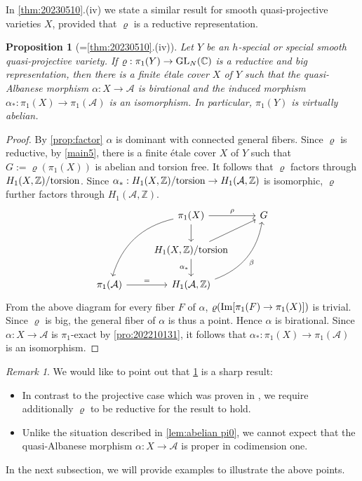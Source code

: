 \documentclass[11pt,english]{smfart}
\theoremstyle{plain}
\newtheorem{proposition}[thm]{Proposition}
\theoremstyle{definition}
\theoremstyle{remark}
\newtheorem{rem}[thm]{Remark}
\numberwithin{equation}{subsection}
\theoremstyle{plain}
\newcommand{\cA}{\mathcal A}
\newcommand{\bC}{\mathbb{C}}
\newcommand{\bZ}{\mathbb{Z}}
\begin{document}
In \cref{thm:20230510}.(iv) we state a similar result  for smooth quasi-projective varieties $X$, provided that $\varrho$ is a reductive representation.   
\begin{proposition}[=\cref{thm:20230510}.(iv)]\label{thm:char}
	Let $Y$ be an $h$-special or   special smooth quasi-projective variety.    If $\varrho:\pi_1(Y)\to {\rm GL}_N(\bC)$ is  a  reductive and  big representation, then there is a finite \'etale cover $X$ of $Y$ such that   the quasi-Albanese morphism $\alpha:X\to \cA$ is  birational  and the induced morphism $\alpha_*:\pi_1(X)\to\pi_1(\cA)$ is an isomorphism.
In particular, $\pi_1(Y)$ is virtually abelian.
\end{proposition}
\begin{proof}
 By \cref{prop:factor} $\alpha$ is dominant with connected general fibers.	Since $\varrho$ is reductive, by \cref{main5},  there is a finite \'etale cover $X$ of $Y$   such that  $G:=\varrho(\pi_1(X))$ is  abelian and torsion free. It follows that $\varrho$ factors through  $H_1(X,\bZ)/{\rm torsion}$. 
	Since $\alpha_*:H_1(X,\bZ)/{\rm torsion}\to H_1(\cA,\bZ)$ is isomorphic,  $\varrho$ further factors through 	$H_1(\cA,\bZ)$.
	\begin{equation*}
		\begin{tikzcd}
			&	\pi_1(X) \arrow[d]\arrow[r, "\rho"] \arrow[ldd, bend right=30]& G\\
			&	H_1(X,\bZ)/{\rm torsion} \arrow[ru]\arrow[d, "\alpha_*"']&\\
			\pi_1(\cA)\arrow[r, "="]	&	H_1(\cA,\bZ)\arrow[ruu, bend right=30,, "\beta"']&
		\end{tikzcd}
	\end{equation*}
	From the above diagram for every fiber $F$ of $\alpha$,   $\varrho({\rm Im}[\pi_1(F)\to \pi_1(X)])$ is trivial.   Since $\varrho$ is big,  the general fiber of $\alpha$ is thus a point. Hence $\alpha$ is birational.  Since $\alpha:X\to \cA$ is $\pi_1$-exact by \cref{pro:202210131}, it follows that  $\alpha_*:\pi_1(X)\to \pi_1(\cA)$ is an isomorphism. 
\end{proof}
\begin{rem}\label{rem:sharp abelian} 
We would like to point out that \cref{thm:char} is a sharp result:
	  \begin{itemize}
	 	\item In contrast to the projective case which was proven in \cite{Yam10}, we require additionally $\varrho$ to be reductive for the result to hold.
	 	\item Unlike the situation described in \cref{lem:abelian pi0},  we cannot expect that the quasi-Albanese morphism $\alpha:X\to \cA$ is proper in codimension one.
	 \end{itemize}
 In the next subsection, we will provide examples to illustrate the above points.
\end{rem}
\end{document}
